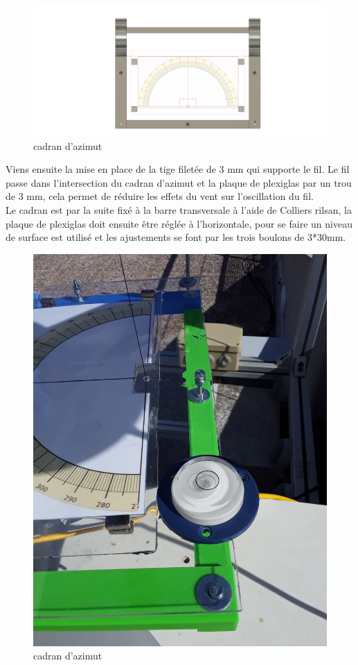 \documentclass[12pt,a4paper]{article}
\begin{document}
\begin{flushleft}
\begin{figure}[H]
\centering
\includegraphics[width=12cm]{image/montage/boussole_solaire/5.png} 
\caption{cadran d'azimut}
\end{figure}


Viens ensuite la mise en place de la tige filetée de 3 mm qui supporte le fil. Le fil passe dans l'intersection du cadran d'azimut et la plaque de plexiglas par un trou de 3 mm, cela permet de réduire les effets du vent sur l'oscillation du fil.\\
Le cadran est par la suite fixé à la barre transversale à l'aide de Colliers rilsan, la plaque de plexiglas doit ensuite être réglée à l'horizontale, pour se faire un niveau de surface est utilisé et les ajustements se font par les trois boulons de 3*30mm.

\begin{figure}[H]
\centering
\includegraphics[width=12cm]{image/montage/boussole_solaire/7.jpg} 
\caption{cadran d'azimut}
\end{figure}


\end{flushleft}
\end{document}
